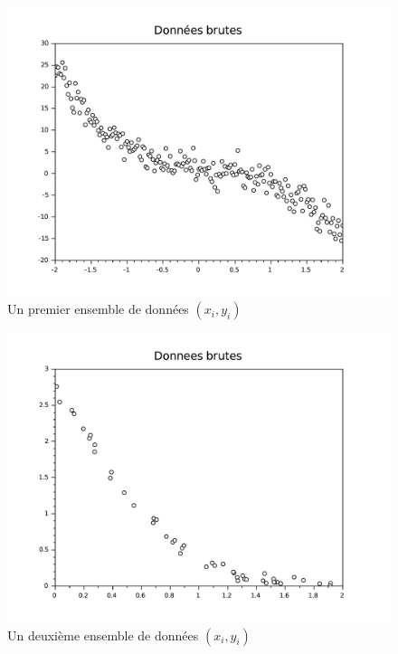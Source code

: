 \documentclass[a4paper,10pt]{report}
\begin{document}
\begin{minipage}[c]{.45\linewidth}
	\begin{figure}[H]
	\caption{Un premier ensemble de données $(x_i,y_i)$}
	\centering
	\includegraphics[width=\textwidth]{donnes_brutes.pdf}
	\end{figure}
\end{minipage}
\begin{minipage}[c]{.05\linewidth}
\end{minipage} \hfill
\begin{minipage}[c]{.45\linewidth}
	\begin{figure}[H]
	\caption{Un deuxième ensemble de données $(x_i,y_i)$}
	\centering
	\includegraphics[width=\textwidth]{donnes_brutes2.pdf}
	\end{figure}
\end{minipage} \hfill \\ \\
\end{document}
